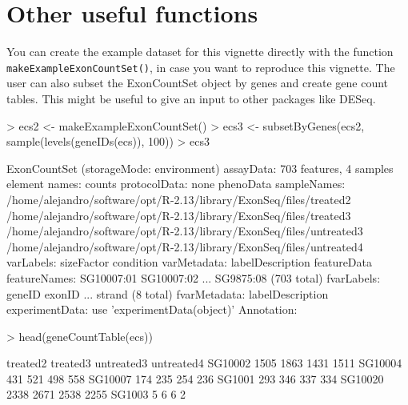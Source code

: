 \documentclass{article}
\begin{document}
\section{Other useful functions}
You can create the example dataset for this vignette directly with the function \texttt{makeExampleExonCountSet()}, in case you want to reproduce this vignette. The user can also subset the ExonCountSet object by genes and create gene count tables.  This might be useful to give an input to other packages like DESeq.
\begin{Schunk}
\begin{Sinput}
> ecs2 <- makeExampleExonCountSet()
> ecs3 <- subsetByGenes(ecs2, sample(levels(geneIDs(ecs)), 100))
> ecs3
\end{Sinput}
\begin{Soutput}
ExonCountSet (storageMode: environment)
assayData: 703 features, 4 samples 
  element names: counts 
protocolData: none
phenoData
  sampleNames:
    /home/alejandro/software/opt/R-2.13/library/ExonSeq/files/treated2
    /home/alejandro/software/opt/R-2.13/library/ExonSeq/files/treated3
    /home/alejandro/software/opt/R-2.13/library/ExonSeq/files/untreated3
    /home/alejandro/software/opt/R-2.13/library/ExonSeq/files/untreated4
  varLabels: sizeFactor condition
  varMetadata: labelDescription
featureData
  featureNames: SG10007:01 SG10007:02 ... SG9875:08 (703 total)
  fvarLabels: geneID exonID ... strand (8 total)
  fvarMetadata: labelDescription
experimentData: use 'experimentData(object)'
Annotation:  
\end{Soutput}
\begin{Sinput}
> head(geneCountTable(ecs))
\end{Sinput}
\begin{Soutput}
        treated2 treated3 untreated3 untreated4
SG10002     1505     1863       1431       1511
SG10004      431      521        498        558
SG10007      174      235        254        236
SG1001       293      346        337        334
SG10020     2338     2671       2538       2255
SG1003         5        6          6          2
\end{Soutput}
\end{Schunk}
\end{document}
